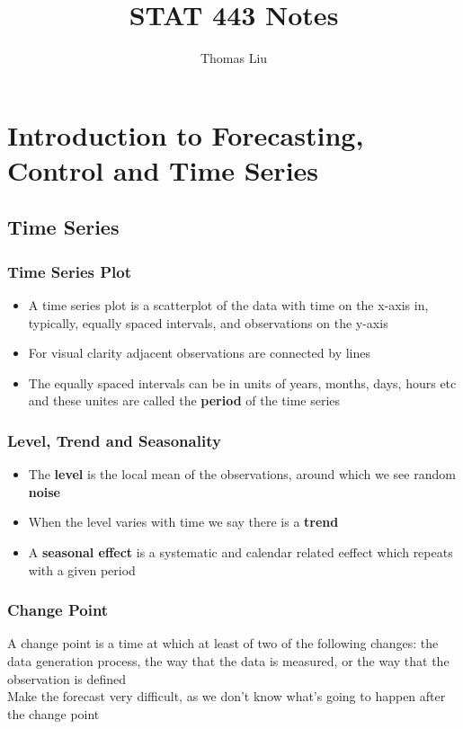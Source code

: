 \documentclass[11pt]{article}
\title{STAT 443 Notes}
\author{Thomas Liu}
\begin{document}
\maketitle
\tableofcontents

\newpage 
\section{Introduction to Forecasting, Control and Time Series}
\subsection{Time Series}
\subsubsection{Time Series Plot}
\begin{itemize}
    \item A time series plot is a scatterplot of the data with time on the x-axis in, typically, equally spaced intervals, and observations on the y-axis 
    \item For visual clarity adjacent observations are connected by lines 
    \item The equally spaced intervals can be in units of years, months, days, hours etc and these unites are called the \textbf{period} of the time series 
\end{itemize}
\subsubsection{Level, Trend and Seasonality}
\begin{itemize}
    \item The \textbf{level} is the local mean of the observations, around which we see random \textbf{noise}
    \item When the level varies with time we say there is a \textbf{trend}
    \item A \textbf{seasonal effect} is a systematic and calendar related eeffect which repeats with a given period 
\end{itemize}
\subsubsection{Change Point}
A change point is a time at which at least of two of the following changes: the data generation process, the way that the data is measured, or the way that the observation is defined \\
Make the forecast very difficult, as we don't know what's going to happen after the change point
\end{document}
